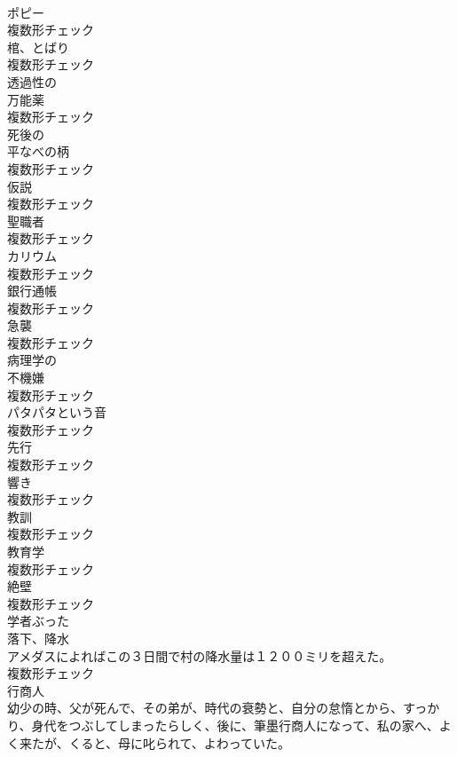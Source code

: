 \documentclass[8pt]{extreport}
\begin{document}
\begin{CJK}{UTF8}{min}
\\	[名詞]	ポピー	
\\	複数形チェック
\\	[名詞]	棺、とばり	
\\	複数形チェック
\\	[形容詞]	透過性の	
\\	[名詞]	万能薬	
\\	複数形チェック
\\	[形容詞]	死後の	
\\	[名詞]	平なべの柄	
\\	複数形チェック
\\	[名詞]	仮説	
\\	複数形チェック
\\	[名詞]	聖職者	
\\	複数形チェック
\\	[名詞]	カリウム	
\\	複数形チェック
\\	[名詞]	銀行通帳	
\\	複数形チェック
\\	[名詞]	急襲	
\\	複数形チェック
\\	[形容詞]	病理学の	
\\	[名詞]	不機嫌	
\\	複数形チェック
\\	[名詞]	パタパタという音	
\\	複数形チェック
\\	[名詞]	先行	
\\	複数形チェック
\\	[名詞]	響き	
\\	複数形チェック
\\	[名詞]	教訓	
\\	複数形チェック
\\	[名詞]	教育学	
\\	複数形チェック
\\	[名詞]	絶壁	
\\	複数形チェック
\\	[形容詞]	学者ぶった	
\\	[名詞]	落下、降水	
\\	アメダスによればこの３日間で村の降水量は１２００ミリを超えた。	
\\	複数形チェック
\\	[名詞]	行商人	
\\	幼少の時、父が死んで、その弟が、時代の衰勢と、自分の怠惰とから、すっかり、身代をつぶしてしまったらしく、後に、筆墨行商人になって、私の家へ、よく来たが、くると、母に叱られて、よわっていた。	

\end{CJK}
\end{document}
